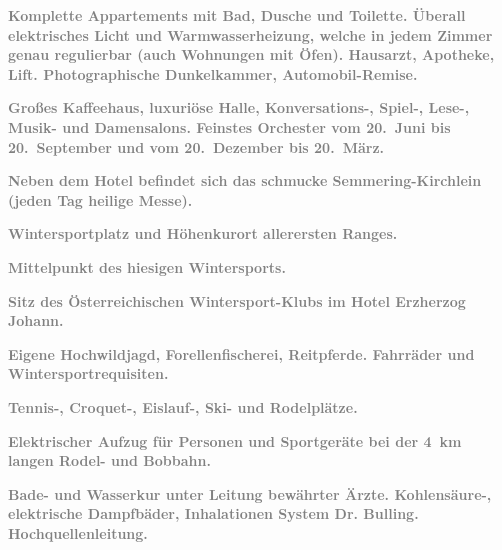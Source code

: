 \pstart
           \centering{}\textcolor{gray}{\textbf{Komplette Appartements mit Bad, Dusche und Toilette. Überall
                  elektrisches Licht und Warmwasserheizung, welche in jedem Zimmer genau regulierbar
                  (auch Wohnungen mit Öfen). Hausarzt, Apotheke, Lift. Photographische Dunkelkammer,
                  Automobil-Remise.}}\pend
           
\pstart
           \centering{}\textcolor{gray}{\textbf{Großes Kaffeehaus, luxuriöse Halle, Konversations-, Spiel-,
                  Lese-, Musik- und Damensalons. Feinstes Orchester vom 20. Juni bis 20. September
                  und vom 20. Dezember bis 20. März.}}\pend
           
\pstart
           \centering{}\textcolor{gray}{\textbf{Neben dem Hotel befindet sich das schmucke Semmering-Kirchlein (jeden Tag heilige Messe).}}\pend
           
\pstart
           \centering{}\textcolor{gray}{\textbf{Wintersportplatz und Höhenkurort allerersten Ranges.}}\pend
           
\pstart
           \centering{}\textcolor{gray}{\textbf{Mittelpunkt des hiesigen Wintersports.}}\pend
           
\pstart
           \centering{}\textcolor{gray}{\textbf{Sitz des Österreichischen
                     Wintersport-Klubs im Hotel Erzherzog
                     Johann.}}\pend
           
\pstart
           \centering{}\textcolor{gray}{\textbf{Eigene Hochwildjagd, Forellenfischerei, Reitpferde. Fahrräder
                  und Wintersportrequisiten.}}\pend
           
\pstart
           \centering{}\textcolor{gray}{\textbf{Tennis-, Croquet-, Eislauf-, Ski- und Rodelplätze.}}\pend
           
\pstart
           \centering{}\textcolor{gray}{\textbf{Elektrischer Aufzug für Personen und Sportgeräte bei der 4 km
                  langen Rodel- und Bobbahn.}}\pend
           
\pstart
           \centering{}\textcolor{gray}{\textbf{Bade- und Wasserkur unter Leitung bewährter Ärzte. Kohlensäure-,
                  elektrische Dampfbäder, Inhalationen System Dr. Bulling. Hochquellenleitung.}}\pend
           
